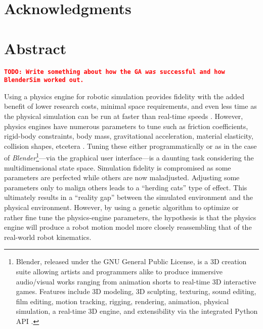 \documentclass{book}[11pt]
\newcommand\todo[1]{\textcolor{red}{\textbf{{\tt TODO: #1}}}}
\begin{document}

  \newpage
  
  
  
  \section*{Acknowledgments}

  \newpage
  
  
  \section*{Abstract}
  
  \todo{Write something about how the GA \textit{was} successful and how BlenderSim worked out.}

  Using a physics engine for robotic simulation provides fidelity with the added benefit of lower research costs, minimal space requirements, and even less time as the physical simulation can be run at faster than real-time speeds \cite{forklift}. However, physics engines have numerous parameters to tune such as friction coefficients, rigid-body constraints, body mass, gravitational acceleration, material elasticity, collision shapes, etcetera \cite{website:blender-rigidbody}\cite{website:blender-objecttype}. Tuning these either programmatically or as in the case of \textit{Blender}\footnote{Blender, released under the GNU General Public License, is a 3D creation suite allowing artists and programmers alike to produce immersive audio/visual works ranging from animation shorts to real-time 3D interactive games. Features include 3D modeling, 3D sculpting, texturing, sound editing, film editing, motion tracking, rigging, rendering, animation, physical simulation, a real-time 3D engine, and extensibility via the integrated Python API \cite{Hess:2007:EBG:1543288}.}---via the graphical user interface---is a daunting task considering the multidimensional state space. Simulation fidelity is compromised as some parameters are perfected while others are now maladjusted. Adjusting some parameters only to malign others leads to a ``herding cats'' type of effect. This ultimately results in a ``reality gap'' between the simulated environment and the physical environment. However, by using a genetic algorithm to optimize or rather fine tune the physics-engine parameters, the hypothesis is that the physics engine will produce a robot motion model more closely reassembling that of the real-world robot kinematics.
  
\end{document}
